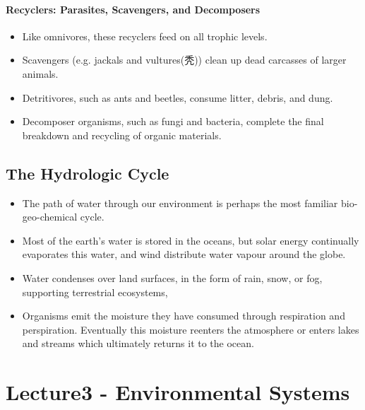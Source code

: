 \documentclass[10pt]{article}
\begin{document}
\paragraph{Recyclers: Parasites, Scavengers, and Decomposers}
\begin{itemize}
    \item Like omnivores, these recyclers feed on all trophic levels. 
    \item Scavengers (e.g. jackals and vultures(秃)) clean up dead carcasses of larger animals. 
    \item Detritivores, such as ants and beetles, consume litter, debris, and dung. 
    \item Decomposer organisms, such as fungi and bacteria, complete the final breakdown and recycling of organic materials. 
\end{itemize}

\subsection{The Hydrologic Cycle}
\begin{itemize}
    \item The path of water through our environment is perhaps the most familiar bio-geo-chemical cycle. 
    \item Most of the earth's water is stored in the oceans, but solar energy continually evaporates this water, and wind distribute water vapour around the globe. 
    \item Water condenses over land surfaces, in the form of rain, snow, or fog, supporting terrestrial ecosystems, 
    \item Organisms emit the moisture they have consumed through respiration and perspiration. Eventually this moisture reenters the atmosphere or enters lakes and streams which ultimately returns it to the ocean. 
\end{itemize}

\section{Lecture3 - Environmental Systems}
\end{document}

